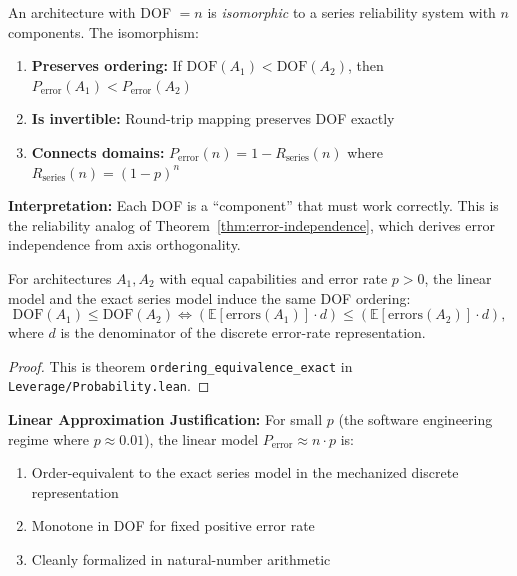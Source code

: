 \begin{theorem}\label{thm:dof-reliability}
An architecture with DOF $= n$ is \emph{isomorphic} to a series reliability system with $n$ components. The isomorphism:
\begin{enumerate}
\item \textbf{Preserves ordering:} If $\text{DOF}(A_1) < \text{DOF}(A_2)$, then $P_{\text{error}}(A_1) < P_{\text{error}}(A_2)$
\item \textbf{Is invertible:} Round-trip mapping preserves DOF exactly
\item \textbf{Connects domains:} $P_{\text{error}}(n) = 1 - R_{\text{series}}(n)$ where $R_{\text{series}}(n) = (1-p)^n$
\end{enumerate}
\end{theorem}

\textbf{Interpretation:} Each DOF is a ``component'' that must work correctly. This is the reliability analog of Theorem~\ref{thm:error-independence}, which derives error independence from axis orthogonality.

\begin{theorem}\label{thm:approx-bound}
For architectures $A_1,A_2$ with equal capabilities and error rate $p>0$, the linear model and the exact series model induce the same DOF ordering:
\[
\text{DOF}(A_1)\le \text{DOF}(A_2)
\iff
(\mathbb{E}[\text{errors}(A_1)]\cdot d)\le(\mathbb{E}[\text{errors}(A_2)]\cdot d),
\]
where $d$ is the denominator of the discrete error-rate representation.
\end{theorem}

\begin{proof}
This is theorem \texttt{ordering\_equivalence\_exact} in \texttt{Leverage/Probability.lean}.
\end{proof}

\textbf{Linear Approximation Justification:} For small $p$ (the software engineering regime where $p \approx 0.01$), the linear model $P_{\text{error}} \approx n \cdot p$ is:
\begin{enumerate}
\item Order-equivalent to the exact series model in the mechanized discrete representation
\item Monotone in DOF for fixed positive error rate
\item Cleanly formalized in natural-number arithmetic
\end{enumerate}

